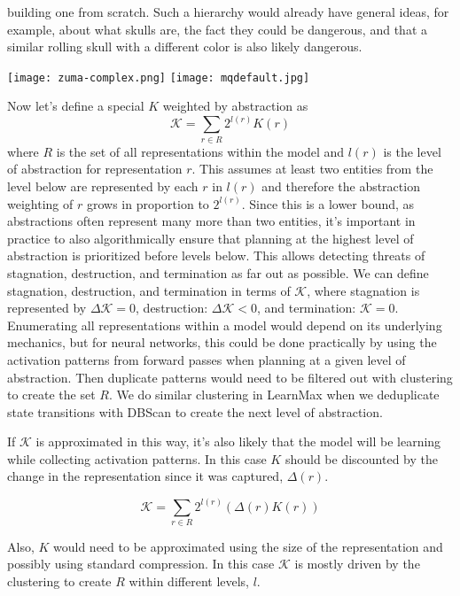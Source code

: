 \documentclass{article}
\begin{document}
building one from scratch. Such a hierarchy would already have general ideas, for example, about what skulls are, the fact they could be dangerous, and that a similar rolling skull with a different color is also likely dangerous.


\texttt{[image: zuma-complex.png]}
\texttt{[image: mqdefault.jpg]}

Now let's define a special $K$ weighted by abstraction as
\[
\mathcal{K} = \sum_{r \in R}{2^{l(r)}}K(r)
\]
where $R$ is the set of all representations within the model and $l(r)$ is the level of abstraction for representation $r$. This assumes at least two entities from the level below are represented by each $r$ in $l(r)$ and therefore the abstraction weighting of $r$ grows in proportion to $2^{l(r)}$. Since this is a lower bound, as abstractions often represent many more than two entities, it's important in practice to also algorithmically ensure that planning at the highest level of abstraction is prioritized before levels below. This allows detecting threats of stagnation, destruction, and termination as far out as possible. We can define stagnation, destruction, and termination in terms of $\mathcal{K}$, where stagnation is represented by $\Delta \mathcal{K}= 0$, destruction: $\Delta \mathcal{K}< 0$, and termination: $\mathcal{K}= 0$. Enumerating all representations within a model would depend on its underlying mechanics, but for neural networks, this could be done practically by using the activation patterns from forward passes when planning at a given level of abstraction. Then duplicate patterns would need to be filtered out with clustering to create the set $R$. We do similar clustering in LearnMax when we deduplicate state transitions with DBScan\cite{ester1996density} to create the next level of abstraction.

If $\mathcal{K}$ is approximated in this way, it's also likely that the model will be learning while collecting activation patterns. In this case $K$ should be discounted by the change in the representation since it was captured, $\Delta(r)$.

\[
\mathcal{K} = \sum_{r \in R}{2^{l(r)}}(\Delta(r)K(r))
\]

Also, $K$ would need to be approximated using the size of the representation and possibly using standard compression. In this case $\mathcal{K}$ is mostly driven by the clustering to create $R$ within different levels, $l$.
\end{document}
